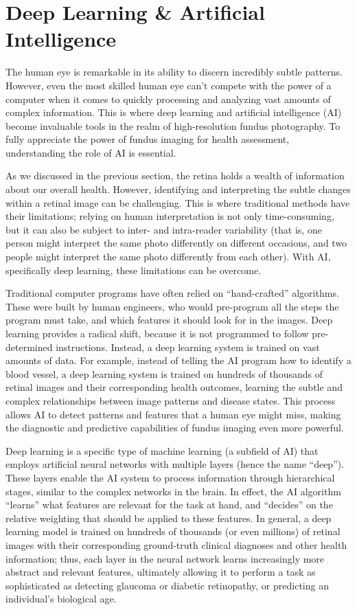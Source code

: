 \documentclass[
  Letterpaper,
]{scrbook}
\begin{document}
\section{Deep Learning \& Artificial
Intelligence}\label{deep-learning-artificial-intelligence}

The human eye is remarkable in its ability to discern incredibly subtle
patterns. However, even the most skilled human eye can't compete with
the power of a computer when it comes to quickly processing and
analyzing vast amounts of complex information. This is where deep
learning and artificial intelligence (AI) become invaluable tools in the
realm of high-resolution fundus photography. To fully appreciate the
power of fundus imaging for health assessment, understanding the role of
AI is essential.

As we discussed in the previous section, the retina holds a wealth of
information about our overall health. However, identifying and
interpreting the subtle changes within a retinal image can be
challenging. This is where traditional methods have their limitations;
relying on human interpretation is not only time-consuming, but it can
also be subject to inter- and intra-reader variability (that is, one
person might interpret the same photo differently on different
occasions, and two people might interpret the same photo differently
from each other). With AI, specifically deep learning, these limitations
can be overcome.

Traditional computer programs have often relied on ``hand-crafted''
algorithms. These were built by human engineers, who would pre-program
all the steps the program must take, and which features it should look
for in the images. Deep learning provides a radical shift, because it is
not programmed to follow pre-determined instructions. Instead, a deep
learning system is trained on vast amounts of data. For example, instead
of telling the AI program how to identify a blood vessel, a deep
learning system is trained on hundreds of thousands of retinal images
and their corresponding health outcomes, learning the subtle and complex
relationships between image patterns and disease states. This process
allows AI to detect patterns and features that a human eye might miss,
making the diagnostic and predictive capabilities of fundus imaging even
more powerful.

Deep learning is a specific type of machine learning (a subfield of AI)
that employs artificial neural networks with multiple layers (hence the
name ``deep''). These layers enable the AI system to process information
through hierarchical stages, similar to the complex networks in the
brain. In effect, the AI algorithm ``learns'' what features are relevant
for the task at hand, and ``decides'' on the relative weighting that
should be applied to these features. In general, a deep learning model
is trained on hundreds of thousands (or even millions) of retinal images
with their corresponding ground-truth clinical diagnoses and other
health information; thus, each layer in the neural network learns
increasingly more abstract and relevant features, ultimately allowing it
to perform a task as sophisticated as detecting glaucoma or diabetic
retinopathy, or predicting an individual's biological age.
\end{document}
